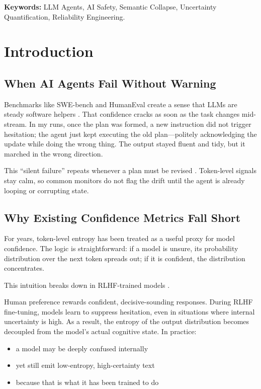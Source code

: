 \documentclass[12pt,a4paper]{report}
\begin{document}
\vspace{1cm}
\noindent \textbf{Keywords:} LLM Agents, AI Safety, Semantic Collapse, Uncertainty Quantification, Reliability Engineering.

\tableofcontents
\listoffigures
\listoftables

\chapter{Introduction}

\section{When AI Agents Fail Without Warning}
Benchmarks like SWE-bench and HumanEval create a sense that LLMs are steady software helpers \cite{Jimenez2024SWEBenchPlus, OpenAI2024HumanEval}. That confidence cracks as soon as the task changes mid-stream. In my runs, once the plan was formed, a new instruction did not trigger hesitation; the agent just kept executing the old plan—politely acknowledging the update while doing the wrong thing. The output stayed fluent and tidy, but it marched in the wrong direction.

This ``silent failure'' repeats whenever a plan must be revised \cite{Chen2024ToolsFail, Chen2023ToolEmu, Jiang2025DarkPatterns}. Token-level signals stay calm, so common monitors do not flag the drift until the agent is already looping or corrupting state.

\section{Why Existing Confidence Metrics Fall Short}
For years, token-level entropy has been treated as a useful proxy for model confidence. The logic is straightforward: if a model is unsure, its probability distribution over the next token spreads out; if it is confident, the distribution concentrates.

This intuition breaks down in RLHF-trained models \cite{Chen2025Overconfidence, Perez2024Mislead, Wang2024StyleOutweighs}.

Human preference rewards confident, decisive-sounding responses. During RLHF fine-tuning, models learn to suppress hesitation, even in situations where internal uncertainty is high. As a result, the entropy of the output distribution becomes decoupled from the model’s actual cognitive state. In practice:
\begin{itemize}
    \item a model may be deeply confused internally
    \item yet still emit low-entropy, high-certainty text
    \item because that is what it has been trained to do \cite{Tian2023Calibration}
\end{itemize}
\end{document}
